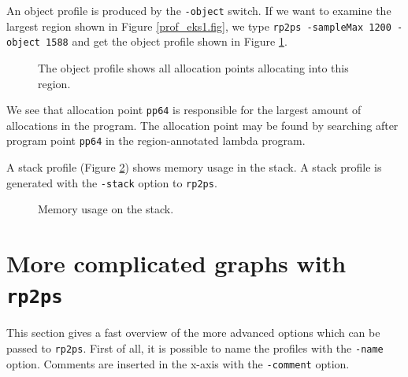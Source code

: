 \documentclass[12pt]{book}
\begin{document}
An object profile is produced by the
\texttt{-object} switch. If we
want to examine the largest region shown in Figure \ref{prof_eks1.fig}, we
type \texttt{rp2ps -sampleMax 1200 -object 1588} and get the object profile shown in
Figure \ref{prof_eks2.fig}.
\begin{figure}[htb]
\begin{center}
  \caption{The object profile shows all
    allocation points allocating into this region.}\label{prof_eks2.fig}
\end{center}
\end{figure}
We see that allocation point \texttt{pp64} is responsible for the largest
amount of allocations in the program. The allocation point may be found by
searching after program point \texttt{pp64} in the region-annotated
lambda program.

A stack profile (Figure \ref{prof_eks3.fig}) shows memory usage in
the stack. A stack profile is generated with the \texttt{-stack}
option to \texttt{rp2ps}.

\begin{figure}[htb]
\begin{center}
  \caption{Memory usage on the stack.}\label{prof_eks3.fig}
\end{center}
\end{figure}

\section{More complicated graphs with \texttt{rp2ps}}
This section gives a fast overview of the more advanced options which can
be passed to \texttt{rp2ps}. First of all, it is possible to name the
profiles with the \texttt{-name} option. Comments are inserted in the
x-axis with the \texttt{-comment} option.
\end{document}
